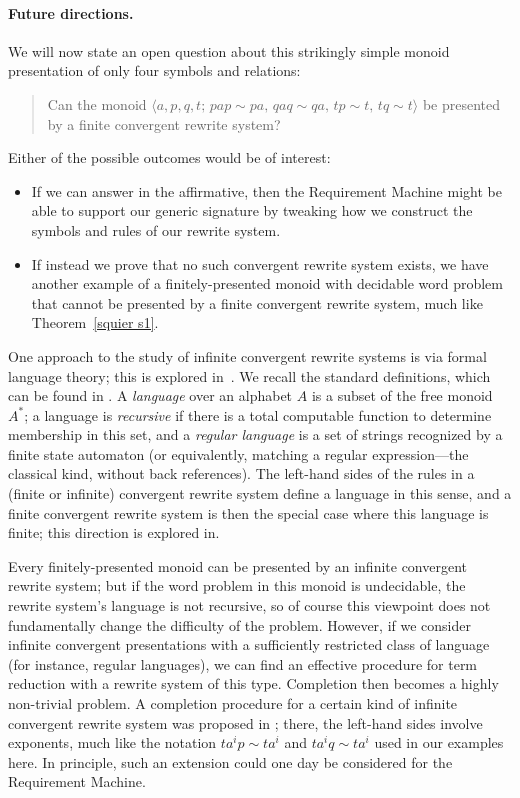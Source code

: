 \documentclass[../generics]{subfiles}
\begin{document}
\begin{example}
\paragraph{Future directions.} We will now state an open question about this strikingly simple monoid presentation of only four symbols and relations:
\begin{quote}
Can the monoid $\langle a,p,q,t;\,pap\sim pa,\, qaq\sim qa,\, tp\sim t,\, tq\sim t\rangle$ be presented by a finite convergent rewrite system?
\end{quote}
Either of the possible outcomes would be of interest:
\begin{itemize}
\item If we can answer in the affirmative, then the Requirement Machine might be able to support our generic signature by tweaking how we construct the symbols and rules of our rewrite system.
\item If instead we prove that no such convergent rewrite system exists, we have another example of a finitely-presented monoid with decidable word problem that cannot be presented by a finite convergent rewrite system, much like Theorem~\ref{squier s1}.
\end{itemize}

One approach to the study of infinite convergent rewrite systems is via formal language theory; this is explored in~\cite{OTTO1998621}. We recall the standard definitions, which can be found in \cite{formalmans1}. A \emph{language} over an alphabet $A$ is a subset of the free monoid $A^*$; a language is \emph{recursive} if there is a total computable function to determine membership in this set, and a \emph{regular language} is a set of strings recognized by a finite state automaton (or equivalently, matching a regular expression---the classical kind, without back references). The left-hand sides of the rules in a (finite or infinite) convergent rewrite system define a language in this sense, and a finite convergent rewrite system is then the special case where this language is finite; this direction is explored in.

Every finitely-presented monoid can be presented by an infinite convergent rewrite system; but if the word problem in this monoid is undecidable, the rewrite system's language is not recursive, so of course this viewpoint does not fundamentally change the difficulty of the problem. However, if we consider infinite convergent presentations with a sufficiently restricted class of language (for instance, regular languages), we can find an effective procedure for term reduction with a rewrite system of this type. Completion then becomes a highly non-trivial problem. A completion procedure for a certain kind of infinite convergent rewrite system was proposed in \cite{NEEDHAM1996195}; there, the left-hand sides involve exponents, much like the notation $ta^ip\sim ta^i$ and $ta^iq\sim ta^i$ used in our examples here. In principle, such an extension could one day be considered for the Requirement Machine.
\end{example}
\end{document}

